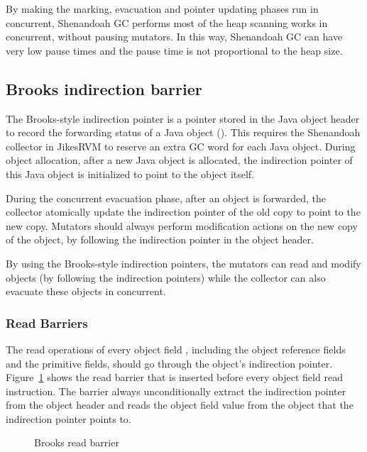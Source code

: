 By making the marking, evacuation and pointer updating phases run in concurrent, Shenandoah GC performs
most of the heap scanning works in concurrent, without pausing mutators. In this way,
Shenandoah GC can have very low pause times and the pause time is not proportional
to the heap size.

\subsection{Brooks indirection barrier}


The Brooks-style indirection pointer is a pointer stored in the Java object header
to record the forwarding status of a Java object (\cite{flood2016shenandoah}).
This requires the Shenandoah collector in JikesRVM to reserve an extra GC word for each
Java object. During object allocation, after a new Java object is allocated, the indirection
pointer of this Java object is initialized to point to the object itself.

During the concurrent evacuation phase, after an object is forwarded,
the collector atomically update the indirection pointer of the old copy to point to the new copy.
Mutators should always perform modification actions on the new copy of the object,
by following the indirection pointer in the object header.

By using the Brooks-style indirection pointers, the mutators can read and modify objects
(by following the indirection pointers) while the collector can also evacuate these
objects in concurrent.

\subsubsection{Read Barriers}

The read operations of every object field , including the object
reference fields and the primitive fields, should go through the object's indirection pointer.
Figure~\ref{fig:brooksreadbarrier} shows the read barrier that is inserted before every object field read instruction.
The barrier always unconditionally extract the indirection pointer from the object header
and reads the object field value from the object that the indirection pointer points to.

\begin{figure}
  \centering
  
  \caption{Brooks read barrier}
  \label{fig:brooksreadbarrier}
\end{figure}

